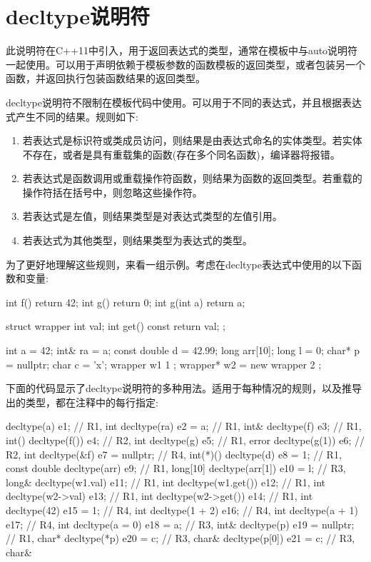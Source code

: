 \section{decltype说明符}
此说明符在C++11中引入，用于返回表达式的类型，通常在模板中与auto说明符一起使用。可以用于声明依赖于模板参数的函数模板的返回类型，或者包装另一个函数，并返回执行包装函数结果的返回类型。

decltype说明符不限制在模板代码中使用。可以用于不同的表达式，并且根据表达式产生不同的结果。规则如下:

\begin{enumerate}
\item
若表达式是标识符或类成员访问，则结果是由表达式命名的实体类型。若实体不存在，或者是具有重载集的函数(存在多个同名函数)，编译器将报错。

\item
若表达式是函数调用或重载操作符函数，则结果为函数的返回类型。若重载的操作符括在括号中，则忽略这些操作符。

\item
若表达式是左值，则结果类型是对表达式类型的左值引用。

\item
若表达式为其他类型，则结果类型为表达式的类型。
\end{enumerate}

为了更好地理解这些规则，来看一组示例。考虑在decltype表达式中使用的以下函数和变量:

\begin{cpp}
int f() { return 42; }
int g() { return 0; }
int g(int a) { return a; }

struct wrapper
{
	int val;
	int get() const { return val; }
};

int a = 42;
int& ra = a;
const double d = 42.99;
long arr[10];
long l = 0;
char* p = nullptr;
char c = 'x';
wrapper w1{ 1 };
wrapper* w2 = new wrapper{ 2 };
\end{cpp}

下面的代码显示了decltype说明符的多种用法。适用于每种情况的规则，以及推导出的类型，都在注释中的每行指定:

\begin{cpp}
decltype(a) e1; // R1, int
decltype(ra) e2 = a; // R1, int&
decltype(f) e3; // R1, int()
decltype(f()) e4; // R2, int
decltype(g) e5; // R1, error
decltype(g(1)) e6; // R2, int
decltype(&f) e7 = nullptr; // R4, int(*)()
decltype(d) e8 = 1; // R1, const double
decltype(arr) e9; // R1, long[10]
decltype(arr[1]) e10 = l; // R3, long&
decltype(w1.val) e11; // R1, int
decltype(w1.get()) e12; // R1, int
decltype(w2->val) e13; // R1, int
decltype(w2->get()) e14; // R1, int
decltype(42) e15 = 1; // R4, int
decltype(1 + 2) e16; // R4, int
decltype(a + 1) e17; // R4, int
decltype(a = 0) e18 = a; // R3, int&
decltype(p) e19 = nullptr; // R1, char*
decltype(*p) e20 = c; // R3, char&
decltype(p[0]) e21 = c; // R3, char&
\end{cpp}

